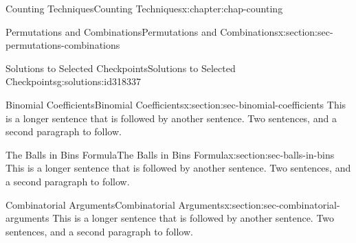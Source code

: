 \documentclass[oneside,10pt,]{book}
\newcommand{\blocktitlefont}{\relax}
\numberwithin{equation}{section}
\begin{document}
\begin{chapterptx}{Counting Techniques}{}{Counting Techniques}{}{}{x:chapter:chap-counting}
\begin{sectionptx}{Permutations and Combinations}{}{Permutations and Combinations}{}{}{x:section:sec-permutations-combinations}
\begin{solutions-subsection}{Solutions to Selected Checkpoints}{}{Solutions to Selected Checkpoints}{}{}{g:solutions:id318337}
\end{solutions-subsection}
\end{sectionptx}
%
%
\typeout{************************************************}
\typeout{************************************************}
%
\begin{sectionptx}{Binomial Coefficients}{}{Binomial Coefficients}{}{}{x:section:sec-binomial-coefficients}
This is a longer sentence that is followed by another sentence. Two sentences, and a second paragraph to follow.%
\end{sectionptx}
%
%
\typeout{************************************************}
\typeout{************************************************}
%
\begin{sectionptx}{The Balls in Bins Formula}{}{The Balls in Bins Formula}{}{}{x:section:sec-balls-in-bins}
This is a longer sentence that is followed by another sentence. Two sentences, and a second paragraph to follow.%
\end{sectionptx}
%
%
\typeout{************************************************}
\typeout{************************************************}
%
\begin{sectionptx}{Combinatorial Arguments}{}{Combinatorial Arguments}{}{}{x:section:sec-combinatorial-arguments}
This is a longer sentence that is followed by another sentence. Two sentences, and a second paragraph to follow.%
\end{sectionptx}

\end{chapterptx}
\end{document}
